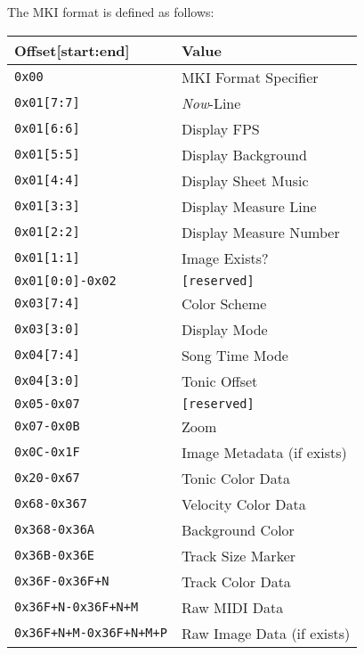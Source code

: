 \documentclass[english]{article}
\makeatletter
\newenvironment{restoretext}%
    {\@parboxrestore%
     \begin{adjustwidth}{}{\leftmargin}%
    }{\end{adjustwidth}
     }
\def\rcbegin{\begin{restoretext}\centering}
\def\rcend{\end{restoretext}}
\providecommand{\mi}[1]{\texttt{#1}}
\makeatother
\begin{document}
The MKI format is defined as follows:

\vspace{1em}

\rcbegin
\begin{tabular}{|l|l|}
  \hline
  \textbf{Offset[start:end]}    & \textbf{Value} \\
  \hline
  \mi{0x00}                       & MKI Format Specifier\\
  \mi{0x01[7:7]}                  & \textit{Now}-Line \\
  \mi{0x01[6:6]}                  & Display FPS \\
  \mi{0x01[5:5]}                  & Display Background \\
  \mi{0x01[4:4]}                  & Display Sheet Music \\
  \mi{0x01[3:3]}                  & Display Measure Line \\
  \mi{0x01[2:2]}                  & Display Measure Number \\
  \mi{0x01[1:1]}                  & Image Exists? \\
  \mi{0x01[0:0]-0x02}             & \mi{[reserved]} \\
  \mi{0x03[7:4]}                  & Color Scheme \\
  \mi{0x03[3:0]}                  & Display Mode \\
  \mi{0x04[7:4]}                  & Song Time Mode \\
  \mi{0x04[3:0]}                  & Tonic Offset \\
  \mi{0x05-0x07}			            & \mi{[reserved]} \\
  \mi{0x07-0x0B}                  & Zoom \\
  \mi{0x0C-0x1F}                  & Image Metadata (if exists) \\
  \mi{0x20-0x67}                  & Tonic Color Data \\
  \mi{0x68-0x367}                 & Velocity Color Data \\
  \mi{0x368-0x36A}                & Background Color \\
  \mi{0x36B-0x36E}                & Track Size Marker \\
  \mi{0x36F-0x36F+N}              & Track Color Data \\
  \mi{0x36F+N-0x36F+N+M}          & Raw MIDI Data \\
  \mi{0x36F+N+M-0x36F+N+M+P}      & Raw Image Data (if exists) \\

  \hline
\end{tabular}
\rcend
\end{document}
